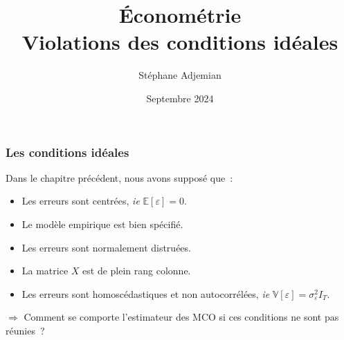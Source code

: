 \documentclass[10pt]{beamer}
\theoremstyle{plain}
\begin{document}
\title{Économétrie\\\small{Violations des conditions idéales}}
\author[S. Adjemian]{Stéphane Adjemian}
\date{Septembre 2024}

\begin{frame}
  \titlepage{}
\end{frame}


\begin{frame}
  \frametitle{Les conditions idéales}

  Dans le chapitre précédent, nous avons supposé que~:\newline

  \medskip

  \begin{itemize}

  \item Les erreurs sont centrées, \textit{ie} $\mathbb E[\varepsilon]=0$.\newline

  \item Le modèle empirique est bien spécifié.\newline

  \item Les erreurs sont normalement distruées.\newline

  \item La matrice $X$ est de plein rang colonne.\newline

  \item Les erreurs sont homoscédastiques et non autocorrélées, \textit{ie}  $\mathbb V[\varepsilon] = \sigma_{\varepsilon}^2I_T$.\newline

  \end{itemize}

  \medskip

  $\Rightarrow$ Comment se comporte l'estimateur des MCO si ces conditions ne sont pas réunies~?

\end{frame}
\end{document}
